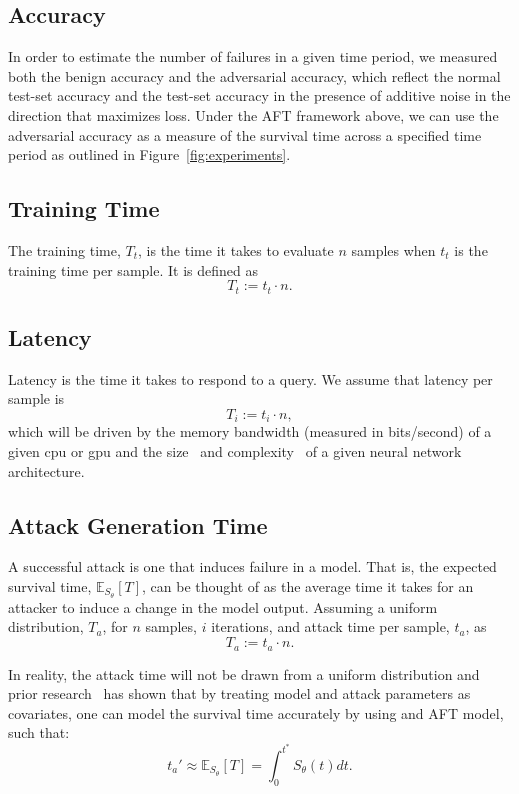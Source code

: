 \documentclass[sn-mathphys-num]{sn-jnl}%
\begin{document}
\subsection{Accuracy}

In order to estimate the number of failures in a given time period, we measured both the benign accuracy and the adversarial accuracy, which reflect the normal test-set accuracy and the test-set accuracy in the presence of additive noise in the direction that maximizes loss. Under the AFT framework above, we can use the adversarial accuracy as a measure of the survival time across a specified time period as outlined in Figure~\ref{fig:experiments}.


\subsection{Training Time}

The training time, $T_t$, is the time it takes to evaluate $n$ samples when $t_t$ is the training time per sample. It is defined as
$$
    T_t := t_t \cdot n.
$$


\subsection{Latency}

Latency is the time it takes to respond to a query. We assume that latency per sample is
$$
    T_i := t_i \cdot n,
$$
which will be driven by the memory bandwidth (measured in bits/second) of a given \acrshort{cpu} or \acrshort{gpu} and the size~\cite{vgg} and complexity~\cite{resnet} of a given neural network architecture.


\subsection{Attack Generation Time}
A successful attack is one that induces failure in a model. That is, the expected survival time, $\mathbb{E}_{S_\theta}[T]$, can be thought of as the average time it takes for an attacker to induce a change in the model output. Assuming a uniform distribution, $T_a$, for $n$ samples, $i$ iterations, and attack time per sample, $t_a$, as
\begin{equation}
    T_a := t_a \cdot n.
    \label{eq:attack_time}
\end{equation}

In reality, the attack time will not be drawn from a uniform distribution and prior research~\cite{meyers_aft} has shown that by treating model and attack parameters as covariates, one can model the survival time accurately by using and AFT model, such that:
\begin{equation}
	t_{a}' \approx \mathbb{E}_{S_\theta}[T] =  \int_{0}^{t^*} S_{\theta}(t) dt.
    \label{eq:aft_time}
\end{equation}
\end{document}
